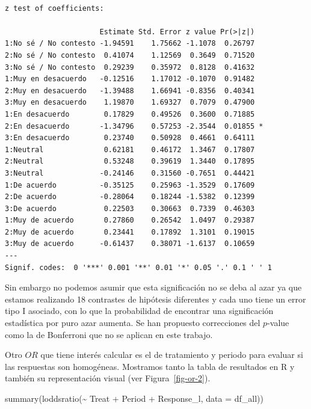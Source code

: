 \documentclass[
  12pt,
  a4paper,
  extrafontsizes,
  onecolumn,
  openright]{memoir}
\newenvironment{Shaded}{\begin{snugshade}}{\end{snugshade}}
\newcommand{\AttributeTok}[1]{\textcolor[rgb]{0.40,0.45,0.13}{#1}}
\newcommand{\FunctionTok}[1]{\textcolor[rgb]{0.28,0.35,0.67}{#1}}
\newcommand{\NormalTok}[1]{\textcolor[rgb]{0.00,0.23,0.31}{#1}}
\newcommand{\SpecialCharTok}[1]{\textcolor[rgb]{0.37,0.37,0.37}{#1}}
\begin{document}
\begin{verbatim}

z test of coefficients:

                      Estimate Std. Error z value Pr(>|z|)  
1:No sé / No contesto -1.94591    1.75662 -1.1078  0.26797  
2:No sé / No contesto  0.41074    1.12569  0.3649  0.71520  
3:No sé / No contesto  0.29239    0.35972  0.8128  0.41632  
1:Muy en desacuerdo   -0.12516    1.17012 -0.1070  0.91482  
2:Muy en desacuerdo   -1.39488    1.66941 -0.8356  0.40341  
3:Muy en desacuerdo    1.19870    1.69327  0.7079  0.47900  
1:En desacuerdo        0.17829    0.49526  0.3600  0.71885  
2:En desacuerdo       -1.34796    0.57253 -2.3544  0.01855 *
3:En desacuerdo        0.23740    0.50928  0.4661  0.64111  
1:Neutral              0.62181    0.46172  1.3467  0.17807  
2:Neutral              0.53248    0.39619  1.3440  0.17895  
3:Neutral             -0.24146    0.31560 -0.7651  0.44421  
1:De acuerdo          -0.35125    0.25963 -1.3529  0.17609  
2:De acuerdo          -0.28064    0.18244 -1.5382  0.12399  
3:De acuerdo           0.22503    0.30663  0.7339  0.46303  
1:Muy de acuerdo       0.27860    0.26542  1.0497  0.29387  
2:Muy de acuerdo       0.23441    0.17892  1.3101  0.19015  
3:Muy de acuerdo      -0.61437    0.38071 -1.6137  0.10659  
---
Signif. codes:  0 '***' 0.001 '**' 0.01 '*' 0.05 '.' 0.1 ' ' 1
\end{verbatim}

\normalsize

Sin embargo no podemos asumir que esta significación no se deba al azar
ya que estamos realizando 18 contrastes de hipótesis diferentes y cada
uno tiene un error tipo I asociado, con lo que la probabilidad de
encontrar una significación estadística por puro azar aumenta. Se han
propuesto correcciones del \(p\)-value como la de Bonferroni que no se
aplican en este trabajo.

Otro \(OR\) que tiene interés calcular es el de tratamiento y periodo
para evaluar si las respuestas son homogéneas. Mostramos tanto la tabla
de resultados en R y también su representación visual (ver
Figura~\ref{fig-or-2}).

\scriptsize

\begin{Shaded}
\begin{Highlighting}[]
\FunctionTok{summary}\NormalTok{(}\FunctionTok{loddsratio}\NormalTok{(}\SpecialCharTok{\textasciitilde{}}\NormalTok{ Treat }\SpecialCharTok{+}\NormalTok{ Period }\SpecialCharTok{+}\NormalTok{ Response\_l, }\AttributeTok{data =}\NormalTok{ df\_all))}
\end{Highlighting}
\end{Shaded}
\end{document}
